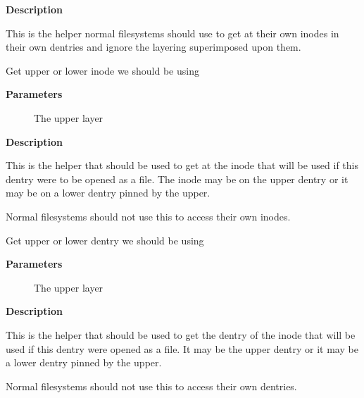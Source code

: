\documentclass[a4paper,8pt,english]{sphinxmanual}
\begin{document}
\textbf{Description}

This is the helper normal filesystems should use to get at their own inodes
in their own dentries and ignore the layering superimposed upon them.

\begin{fulllineitems}
\label{filesystems/index:c.d_backing_inode}
Get upper or lower inode we should be using

\end{fulllineitems}


\textbf{Parameters}
\begin{description}
\item[{}] \leavevmode
The upper layer

\end{description}

\textbf{Description}

This is the helper that should be used to get at the inode that will be used
if this dentry were to be opened as a file.  The inode may be on the upper
dentry or it may be on a lower dentry pinned by the upper.

Normal filesystems should not use this to access their own inodes.

\begin{fulllineitems}
\label{filesystems/index:c.d_backing_dentry}
Get upper or lower dentry we should be using

\end{fulllineitems}


\textbf{Parameters}
\begin{description}
\item[{}] \leavevmode
The upper layer

\end{description}

\textbf{Description}

This is the helper that should be used to get the dentry of the inode that
will be used if this dentry were opened as a file.  It may be the upper
dentry or it may be a lower dentry pinned by the upper.

Normal filesystems should not use this to access their own dentries.
\end{document}
